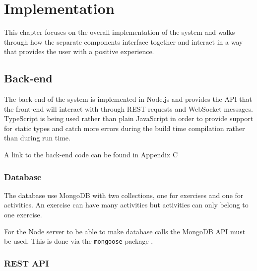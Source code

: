 \chapter{Implementation}


This chapter focuses on the overall implementation of the system and walks through how the separate components interface together and interact in a way that provides the user with a positive experience.

\section{Back-end}

The back-end of the system is implemented in Node.js and provides the API that the front-end will interact with through REST requests and WebSocket messages. TypeScript \cite{typescript} is being used rather than plain JavaScript in order to provide support for static types and catch more errors during the build time compilation rather than during run time.

A link to the back-end code can be found in Appendix C

\subsection{Database}

The database use MongoDB \cite{mongo}with two collections, one for exercises and one for activities. An exercise can have many activities but activities can only belong to one exercise.


For the Node server to be able to make database calls the MongoDB API must be used. This is done via the \texttt{mongoose} package \cite{mongoose}.

\subsection{REST API} \label{impl-rest}

